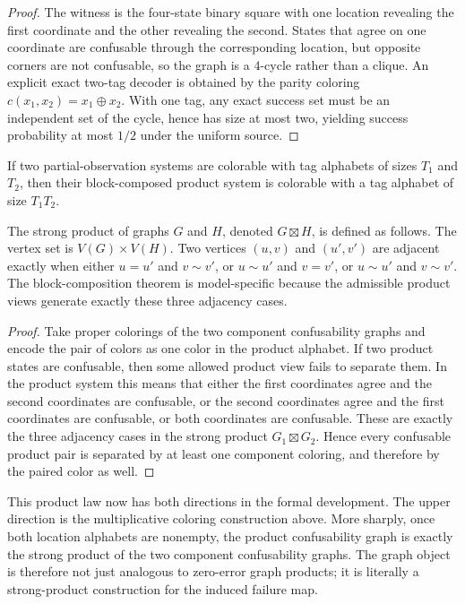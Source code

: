 \begin{proof}
The witness is the four-state binary square with one location revealing the first coordinate and the other revealing the second. States that agree on one coordinate are confusable through the corresponding location, but opposite corners are not confusable, so the graph is a $4$-cycle rather than a clique. An explicit exact two-tag decoder is obtained by the parity coloring $c(x_1,x_2)=x_1\oplus x_2$. With one tag, any exact success set must be an independent set of the cycle, hence has size at most two, yielding success probability at most $1/2$ under the uniform source.
\end{proof}

\begin{theorem}\label{thm:multifact-product}
If two partial-observation systems are colorable with tag alphabets of sizes $T_1$ and $T_2$, then their block-composed product system is colorable with a tag alphabet of size $T_1T_2$.
\end{theorem}

The strong product of graphs $G$ and $H$, denoted $G\boxtimes H$, is defined as follows. The vertex set is $V(G)\times V(H)$. Two vertices $(u,v)$ and $(u',v')$ are adjacent exactly when either $u=u'$ and $v\sim v'$, or $u\sim u'$ and $v=v'$, or $u\sim u'$ and $v\sim v'$. The block-composition theorem is model-specific because the admissible product views generate exactly these three adjacency cases.

\begin{proof}
Take proper colorings of the two component confusability graphs and encode the pair of colors as one color in the product alphabet. If two product states are confusable, then some allowed product view fails to separate them. In the product system this means that either the first coordinates agree and the second coordinates are confusable, or the second coordinates agree and the first coordinates are confusable, or both coordinates are confusable. These are exactly the three adjacency cases in the strong product $G_1\boxtimes G_2$. Hence every confusable product pair is separated by at least one component coloring, and therefore by the paired color as well.
\end{proof}

This product law now has both directions in the formal development. The upper direction is the multiplicative coloring construction above. More sharply, once both location alphabets are nonempty, the product confusability graph is exactly the strong product of the two component confusability graphs. The graph object is therefore not just analogous to zero-error graph products; it is literally a strong-product construction for the induced failure map. 

